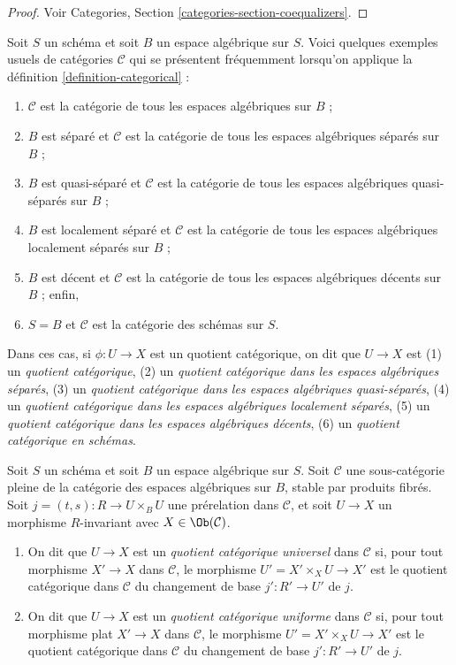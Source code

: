\begin{proof}
Voir Categories, Section \ref{categories-section-coequalizers}.
\end{proof}

\begin{example}
\label{example-categories}
Soit $S$ un schéma et soit $B$ un espace algébrique sur $S$.
Voici quelques exemples usuels de catégories $\mathcal{C}$
qui se présentent fréquemment lorsqu'on applique la
définition \ref{definition-categorical} :
\begin{enumerate}
\item $\mathcal{C}$ est la catégorie de tous les espaces algébriques sur $B$ ;
\item $B$ est séparé et $\mathcal{C}$ est la catégorie de tous les espaces
algébriques séparés sur $B$ ;
\item $B$ est quasi-séparé et $\mathcal{C}$ est la catégorie de tous les espaces
algébriques quasi-séparés sur $B$ ;
\item $B$ est localement séparé et $\mathcal{C}$ est la catégorie de tous les espaces
algébriques localement séparés sur $B$ ;
\item $B$ est décent et $\mathcal{C}$ est la catégorie de tous les espaces algébriques
décents sur $B$ ; enfin,
\item $S = B$ et $\mathcal{C}$ est la catégorie des schémas sur $S$.
\end{enumerate}
Dans ces cas, si $\phi : U \to X$ est un quotient catégorique, on dit que
$U \to X$ est
(1) un {\it quotient catégorique},
(2) un {\it quotient catégorique dans les espaces algébriques séparés},
(3) un {\it quotient catégorique dans les espaces algébriques quasi-séparés},
(4) un {\it quotient catégorique dans les espaces algébriques localement séparés},
(5) un {\it quotient catégorique dans les espaces algébriques décents},
(6) un {\it quotient catégorique en schémas}.
\end{example}

\begin{definition}
\label{definition-universal-categorical}
Soit $S$ un schéma et soit $B$ un espace algébrique sur $S$.
Soit $\mathcal{C}$ une sous-catégorie pleine de la catégorie des espaces
algébriques sur $B$, stable par produits fibrés.
Soit $j = (t, s) : R \to U \times_B U$ une prérelation dans
$\mathcal{C}$, et soit $U \to X$ un morphisme $R$-invariant avec
$X \in \Ob(\mathcal{C})$.
\begin{enumerate}
\item On dit que $U \to X$ est un {\it quotient catégorique universel}
dans $\mathcal{C}$ si, pour tout morphisme $X' \to X$ dans $\mathcal{C}$,
le morphisme $U' = X' \times_X U \to X'$ est le quotient catégorique dans
$\mathcal{C}$ du changement de base $j' : R' \to U'$ de $j$.
\item On dit que $U \to X$ est un {\it quotient catégorique uniforme}
dans $\mathcal{C}$ si, pour tout morphisme plat $X' \to X$ dans $\mathcal{C}$,
le morphisme $U' = X' \times_X U \to X'$ est le quotient catégorique dans
$\mathcal{C}$ du changement de base $j' : R' \to U'$ de $j$.
\end{enumerate}
\end{definition}

